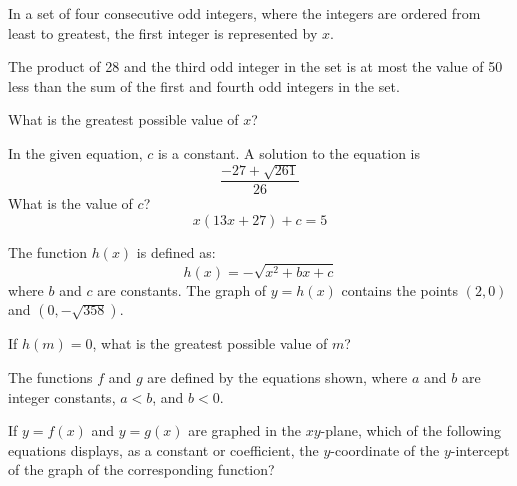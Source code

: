In a set of four consecutive odd integers, where the integers are ordered from least to greatest, the first integer is represented by \(x\).

The product of 28 and the third odd integer in the set is at most the value of 50 less than the sum of the first and fourth odd integers in the set.

What is the greatest possible value of \(x\)?

\vspace{0.75em}


\vspace{2em}
\newpage

\noindent\markforreview
\vspace{1em}

In the given equation, \(c\) is a constant. A solution to the equation is
\[
\frac{-27 + \sqrt{261}}{26}
\]
What is the value of \(c\)?
\[
x(13x + 27) + c = 5
\]

\vspace{0.75em}


\vspace{2em}
\newpage

\noindent\markforreview
\vspace{1em}

The function \(h(x)\) is defined as:
\[
h(x) = -\sqrt{x^2 + bx + c}
\]
where \(b\) and \(c\) are constants. The graph of \(y = h(x)\) contains the points \((2, 0)\) and \((0, -\sqrt{358})\).

If \(h(m) = 0\), what is the greatest possible value of \(m\)?

\vspace{0.75em}


\vspace{2em}
\newpage

\noindent\markforreview
\vspace{1em}

The functions \(f\) and \(g\) are defined by the equations shown, where \(a\) and \(b\) are integer constants, \(a < b\), and \(b < 0\).

If \(y = f(x)\) and \(y = g(x)\) are graphed in the \(xy\)-plane, which of the following equations displays, as a constant or coefficient, the \(y\)-coordinate of the \(y\)-intercept of the graph of the corresponding function?


